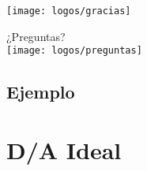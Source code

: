 \documentclass{beamer}
\begin{document}
%

\begin{frame}
  \begin{center}
    \texttt{[image: logos/gracias]}
  \end{center}
\end{frame}

\begin{frame}
  \begin{center}
    \huge{¿Preguntas?}\\
    \vspace{5mm}
    \texttt{[image: logos/preguntas]}
  \end{center}
\end{frame}


\subsection{Ejemplo}

\section{D/A Ideal}
\end{document}
